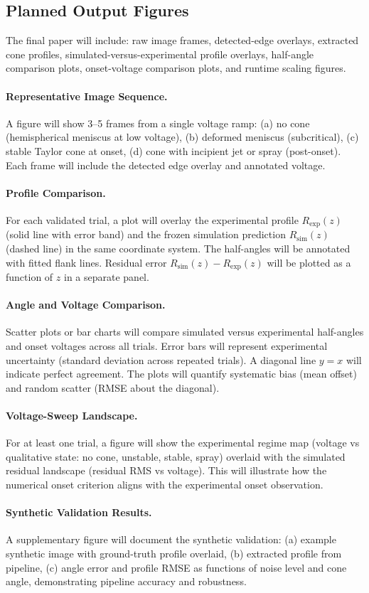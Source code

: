 \subsection{Planned Output Figures}

The final paper will include: raw image frames, detected-edge overlays, extracted cone profiles, simulated-versus-experimental profile overlays, half-angle comparison plots, onset-voltage comparison plots, and runtime scaling figures.

\paragraph{Representative Image Sequence.} A figure will show 3--5 frames from a single voltage ramp: (a) no cone (hemispherical meniscus at low voltage), (b) deformed meniscus (subcritical), (c) stable Taylor cone at onset, (d) cone with incipient jet or spray (post-onset). Each frame will include the detected edge overlay and annotated voltage.

\paragraph{Profile Comparison.} For each validated trial, a plot will overlay the experimental profile $R_{\mathrm{exp}}(z)$ (solid line with error band) and the frozen simulation prediction $R_{\mathrm{sim}}(z)$ (dashed line) in the same coordinate system. The half-angles will be annotated with fitted flank lines. Residual error $R_{\mathrm{sim}}(z) - R_{\mathrm{exp}}(z)$ will be plotted as a function of $z$ in a separate panel.

\paragraph{Angle and Voltage Comparison.} Scatter plots or bar charts will compare simulated versus experimental half-angles and onset voltages across all trials. Error bars will represent experimental uncertainty (standard deviation across repeated trials). A diagonal line $y = x$ will indicate perfect agreement. The plots will quantify systematic bias (mean offset) and random scatter (RMSE about the diagonal).

\paragraph{Voltage-Sweep Landscape.} For at least one trial, a figure will show the experimental regime map (voltage vs qualitative state: no cone, unstable, stable, spray) overlaid with the simulated residual landscape (residual RMS vs voltage). This will illustrate how the numerical onset criterion aligns with the experimental onset observation.

\paragraph{Synthetic Validation Results.} A supplementary figure will document the synthetic validation: (a) example synthetic image with ground-truth profile overlaid, (b) extracted profile from pipeline, (c) angle error and profile RMSE as functions of noise level and cone angle, demonstrating pipeline accuracy and robustness.
